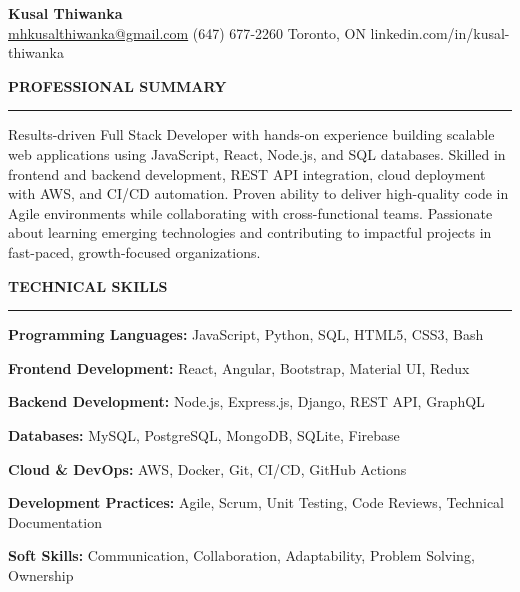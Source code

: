 \documentclass[10pt,letterpaper]{article}
\begin{document}
\begin{center}
{\LARGE\textbf{Kusal Thiwanka}}\\[3pt]
\href{mailto:mhkusalthiwanka@gmail.com}{mhkusalthiwanka@gmail.com}\hspace{2em}%
(647) 677{-}2260\hspace{2em}%
Toronto, ON\hspace{2em}
linkedin.com/in/kusal-thiwanka
\end{center}

\vspace{6pt}

\textbf{PROFESSIONAL SUMMARY}\\[-8pt]
\noindent\rule{\textwidth}{1pt}

\vspace{-2pt}

Results-driven Full Stack Developer with hands-on experience building scalable web applications using JavaScript, React, Node.js, and SQL databases. Skilled in frontend and backend development, REST API integration, cloud deployment with AWS, and CI/CD automation. Proven ability to deliver high-quality code in Agile environments while collaborating with cross-functional teams. Passionate about learning emerging technologies and contributing to impactful projects in fast-paced, growth-focused organizations.

\vspace{8pt}

\textbf{TECHNICAL SKILLS}\\[-8pt]
\noindent\rule{\textwidth}{1pt}

\vspace{-2pt}

\textbf{Programming Languages:} JavaScript, Python, SQL, HTML5, CSS3, Bash

\textbf{Frontend Development:} React, Angular, Bootstrap, Material UI, Redux

\textbf{Backend Development:} Node.js, Express.js, Django, REST API, GraphQL

\textbf{Databases:} MySQL, PostgreSQL, MongoDB, SQLite, Firebase

\textbf{Cloud \& DevOps:} AWS, Docker, Git, CI/CD, GitHub Actions

\textbf{Development Practices:} Agile, Scrum, Unit Testing, Code Reviews, Technical Documentation

\textbf{Soft Skills:} Communication, Collaboration, Adaptability, Problem Solving, Ownership

\vspace{8pt}
\end{document}
